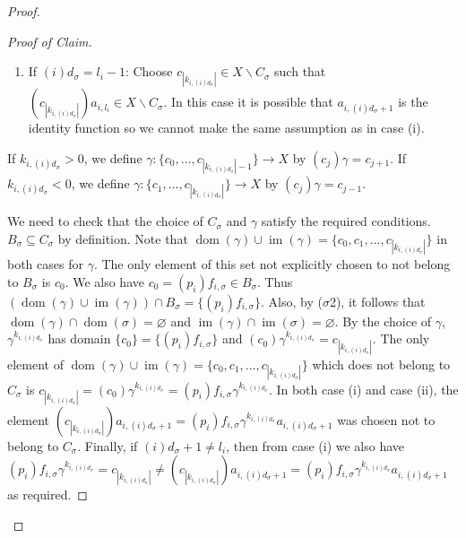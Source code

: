 \documentclass[11pt]{amsart}
\newcommand{\im}{\operatorname{im}}
\newcommand{\dom}{\operatorname{dom}}
\begin{document}
\begin{proof}
\begin{proof}[Proof of Claim]
\begin{enumerate}
       \item[(ii)] If \((i)d_\sigma= l_i-1\): 
         Choose \(c_{|k_{i,(i)d_{\sigma}}|}\in X\backslash C_\sigma\) such that \((c_{|k_{i,(i)d_{\sigma}}|})a_{i,l_i}\in X\backslash C_\sigma\). In this case it is possible that \(a_{i,(i)d_{\sigma}+1}\) is the identity function so we cannot make the same assumption as in case (i).
     \end{enumerate}
     If \(k_{i,(i)d_{\sigma}}>0\), we define \(\gamma: \{c_0,\ldots, c_{|k_{i,(i)d_{\sigma}}|-1}\}\to X\) by \((c_j)\gamma=c_{j+1}\). If \(k_{i,(i)d_{\sigma}}<0\), we define  \(\gamma: \{c_1,\ldots, c_{|k_{i,(i)d_{\sigma}}|}\}\to X\) by \((c_j)\gamma=c_{j-1}\).   

     We need to check that the choice of \(C_\sigma\) and \(\gamma\) satisfy the required conditions. \(B_\sigma \subseteq C_\sigma\) by definition. Note that \(\dom(\gamma)\cup \im(\gamma)=\{c_0, c_1,\ldots, c_{|k_{i,(i)d_{\sigma}}|}\}\) in both cases for \(\gamma\). The only element of this set not explicitly chosen to not belong to \(B_\sigma\) is \(c_0\). We also have \(c_0=(p_i)f_{i,\sigma}\in B_\sigma\). Thus \((\dom(\gamma)\cup \im(\gamma))\cap B_{\sigma}=\{(p_i)f_{i,\sigma}\}\). Also, by ($\sigma$2), it follows that \(\dom(\gamma)\cap \dom(\sigma)=\varnothing\) and \(\im(\gamma)\cap \im(\sigma)=\varnothing\).
     By the choice of \(\gamma\), \(\gamma^{k_{i,(i)d_{\sigma}}}\) has domain \(\{c_0\}=\{(p_i)f_{i,\sigma}\}\) and \((c_0)\gamma^{k_{i,(i)d_{\sigma}}}=c_{|k_{i,(i)d_{\sigma}}|}\).
     The only element of \(\dom(\gamma)\cup \im(\gamma)=\{c_0, c_1,\ldots, c_{|k_{i,(i)d_{\sigma}}|}\}\) which does not belong to \(C_\sigma\) is \(c_{|k_{i,(i)d_{\sigma}}|}=(c_0)\gamma^{k_{i,(i)d_{\sigma}}}=(p_i)f_{i,\sigma}\gamma^{k_{i,(i)d_{\sigma}}}\).
     In both case (i) and case (ii), the element \((c_{|k_{i,(i)d_{\sigma}}|})a_{i, (i)d_{\sigma}+1}=(p_i)f_{i,\sigma}\gamma^{k_{i,(i)d_{\sigma}}}a_{i, (i)d_{\sigma}+1}\) was chosen not to belong to \(C_\sigma\). Finally, if \((i)d_{\sigma}+1\neq l_i\), then from case (i) we also have \((p_i)f_{i,\sigma}\gamma^{k_{i,(i)d_{\sigma}}}=c_{|k_{i,(i)d_{\sigma}}|}\neq (c_{|k_{i,(i)d_{\sigma}}|})a_{i, (i)d_{\sigma}+1}=(p_i)f_{i,\sigma}\gamma^{k_{i,(i)d_{\sigma}}}a_{i, (i)d_{\sigma}+1}\) as required.
     \end{proof}
     

\end{proof}
\end{document}

